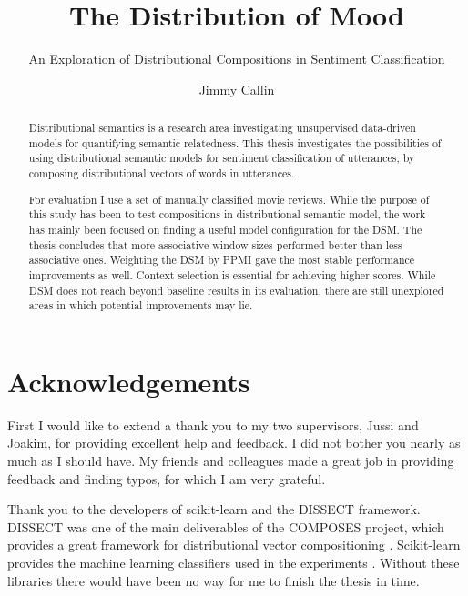 \documentclass[bachelor]{stpthesis}
\begin{document}
 \author{Jimmy Callin}
 \title{The Distribution of Mood}
\subtitle{An Exploration of Distributional Compositions in Sentiment Classification}
\maketitle
\frontmatter*

\begin{abstract}
Distributional semantics is a research area investigating unsupervised data-driven models for quantifying semantic relatedness. This thesis investigates the possibilities of using distributional semantic models for sentiment classification of utterances, by composing distributional vectors of words in utterances.

For evaluation I use a set of manually classified movie reviews. While the purpose of this study has been to test compositions in distributional semantic model, the work has mainly been focused on finding a useful model configuration for the DSM. The thesis concludes that more associative window sizes performed better than less associative ones. Weighting the DSM by PPMI gave the most stable performance improvements as well. Context selection is essential for achieving higher scores. While DSM does not reach beyond baseline results in its evaluation, there are still unexplored areas in which potential improvements may lie.
\end{abstract}

\clearpage
\tableofcontents*

\chapter*{Acknowledgements}
First I would like to extend a thank you to my two supervisors, Jussi and Joakim, for providing excellent help and feedback. I did not bother you nearly as much as I should have. My friends and colleagues made a great job in providing feedback and finding typos, for which I am very grateful.

Thank you to the developers of scikit-learn and the DISSECT framework. DISSECT was one of the main deliverables of the COMPOSES project, which provides a great framework for distributional vector compositioning \parencite{Dinu2013Dissect}. Scikit-learn provides the machine learning classifiers used in the experiments \parencite{Pedregosa2011ScikitLearn}. Without these libraries there would have been no way for me to finish the thesis in time.


\mainmatter*
	
	
    
    
    
    

\printbibliography
\end{document}
